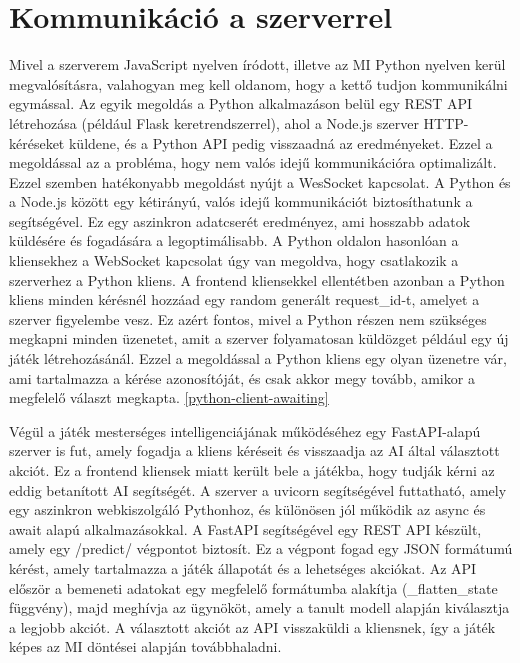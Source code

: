 \documentclass[
]{thesis-ekf}
\theoremstyle{definition}
\theoremstyle{remark}
\begin{document}
\section{Kommunikáció a szerverrel}

Mivel a szerverem JavaScript nyelven íródott, illetve az MI Python nyelven kerül megvalósításra, valahogyan meg kell oldanom, hogy a kettő tudjon kommunikálni egymással. Az egyik megoldás a Python alkalmazáson belül egy REST API létrehozása (például Flask keretrendszerrel), ahol a Node.js szerver HTTP-kéréseket küldene, és a Python API pedig visszaadná az eredményeket. Ezzel a megoldással az a probléma, hogy nem valós idejű kommunikációra optimalizált. Ezzel szemben hatékonyabb megoldást nyújt a WesSocket kapcsolat. A Python és a Node.js között egy kétirányú, valós idejű kommunikációt biztosíthatunk a segítségével. Ez egy aszinkron adatcserét eredményez, ami hosszabb adatok küldésére és fogadására a legoptimálisabb. A Python oldalon hasonlóan a kliensekhez a WebSocket kapcsolat úgy van megoldva, hogy csatlakozik a szerverhez a Python kliens. A frontend kliensekkel ellentétben azonban a Python kliens minden kérésnél hozzáad egy random generált request\_id-t, amelyet a szerver figyelembe vesz. Ez azért fontos, mivel a Python részen nem szükséges megkapni minden üzenetet, amit a szerver folyamatosan küldözget például egy új játék létrehozásánál. Ezzel a megoldással a Python kliens egy olyan üzenetre vár, ami tartalmazza a kérése azonosítóját, és csak akkor megy tovább, amikor a megfelelő választ megkapta. \ref{python-client-awaiting}



Végül a játék mesterséges intelligenciájának működéséhez egy FastAPI-alapú szerver is fut, amely fogadja a kliens kéréseit és visszaadja az AI által választott akciót. Ez a frontend kliensek miatt került bele a játékba, hogy tudják kérni az eddig betanított AI segítségét. A szerver a uvicorn segítségével futtatható, amely egy aszinkron webkiszolgáló Pythonhoz, és különösen jól működik az async és await alapú alkalmazásokkal. A FastAPI segítségével egy REST API készült, amely egy /predict/ végpontot biztosít. Ez a végpont fogad egy JSON formátumú kérést, amely tartalmazza a játék állapotát és a lehetséges akciókat. Az API először a bemeneti adatokat egy megfelelő formátumba alakítja (\_flatten\_state függvény), majd meghívja az  ügynököt, amely a tanult modell alapján kiválasztja a legjobb akciót. A választott akciót az API visszaküldi a kliensnek, így a játék képes az MI döntései alapján továbbhaladni.
\end{document}
